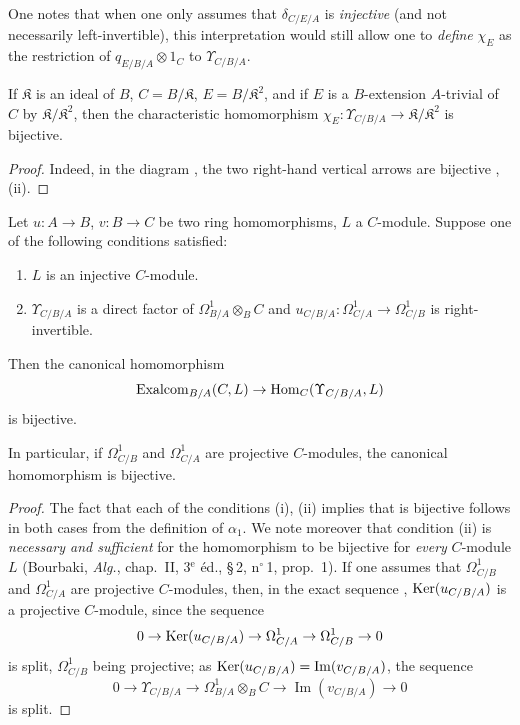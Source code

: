 One notes that when one only assumes that $\delta_{C/E/A}$ is \emph{injective} (and not necessarily left-invertible), this interpretation would still allow one to \emph{define} $\chi_E$ as the restriction of $q_{E/B/A}\otimes 1_C$ to $\Upsilon_{C/B/A}$.

\begin{corollary}[20.6.10]
\label{0.20.6.10}
If $\mathfrak{K}$ is an ideal of $B$, $C=B/\mathfrak{K}$, $E=B/\mathfrak{K}^2$, and if $E$ is a $B$-extension $A$-trivial  of $C$ by $\mathfrak{K}/\mathfrak{K}^2$, then the characteristic homomorphism $\chi_E:\Upsilon_{C/B/A}\to\mathfrak{K}/\mathfrak{K}^2$ is bijective.
\end{corollary}

\begin{proof}
Indeed, in the diagram , the two right-hand vertical arrows are bijective , (ii).
\end{proof}

\begin{theorem}[20.6.11]
\label{0.20.6.11}
Let $u:A\to B$, $v:B\to C$ be two ring homomorphisms, $L$ a $C$-module.
Suppose one of the following conditions satisfied:
\begin{enumerate}
  \item[\rm(i)] $L$ is an injective $C$-module.
  \item[\rm(ii)] $\Upsilon_{C/B/A}$ is a direct factor of $\Omega^1_{B/A}\otimes_B C$ and $u_{C/B/A}:\Omega^1_{C/A}\to\Omega^1_{C/B}$ is right-invertible.
\end{enumerate}
Then the canonical homomorphism 
\[
  \operatorname{Exalcom}_{B/A}(C,L)\to\operatorname{Hom}_C(\Upsilon_{C/B/A},L)
\]
is bijective.

In particular, if $\Omega^1_{C/B}$ and $\Omega^1_{C/A}$ are projective $C$-modules, the canonical homomorphism  is bijective.
\end{theorem}

\begin{proof}
The fact that each of the conditions (i), (ii) implies that  is bijective follows in both cases from the definition of $\alpha_1$.
We note moreover that condition (ii) is \emph{necessary and sufficient} for the homomorphism  to be bijective for \emph{every} $C$-module $L$ (Bourbaki, \emph{Alg.}, chap.~II, 3$^\text{e}$ \'{e}d., \S\,2, n$^\circ$\,1, prop.~1).
If one assumes that $\Omega^1_{C/B}$ and $\Omega^1_{C/A}$ are projective $C$-modules, then, in the exact sequence , $\operatorname{Ker}(u_{C/B/A})$ is a projective $C$-module, since the sequence
\[
  0\to\operatorname{Ker}(u_{C/B/A})\to\Omega^1_{C/A}\to\Omega^1_{C/B}\to 0
\]
is split, $\Omega^1_{C/B}$ being projective; as $\operatorname{Ker}(u_{C/B/A})=\operatorname{Im}(v_{C/B/A})$, the sequence
\[
  0\to\Upsilon_{C/B/A}\to\Omega^1_{B/A}\otimes_B C\to\operatorname{Im}(v_{C/B/A})\to 0
\]
is split.
\end{proof}

